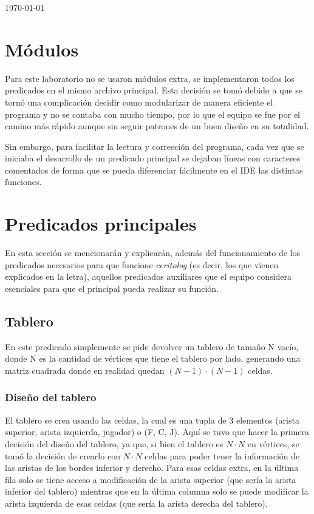 \documentclass[12pt]{article} %
\begin{document}
\begin{titlepage}
		{\large \today}\\[1cm] %
		
		\vfill %
		
	\end{titlepage}
	
	\section{Módulos}
	Para este laboratorio no se usaron módulos extra, se implementaron todos los predicados en el mismo archivo principal. Esta decisión se tomó debido a que se tornó una complicación decidir como modularizar de manera eficiente el programa y no se contaba con mucho tiempo, por lo que el equipo se fue por el camino más rápido aunque sin seguir patrones de un buen diseño en su totalidad.
	
	Sin embargo, para facilitar la lectura y corrección del programa, cada vez que se iniciaba el desarrollo de un predicado principal se dejaban líneas con caracteres comentados de forma que se pueda diferenciar fácilmente en el IDE las distintas funciones.
	
	\section{Predicados principales}
	En esta sección se mencionarán y explicarán, además del funcionamiento de los predicados necesarios para que funcione \textit{ceritolog} (es decir, los que vienen explicados en la letra), aquellos predicados auxiliares que el equipo considera esenciales para que el principal pueda realizar su función.
	
		\subsection{Tablero}
		En este predicado simplemente se pide devolver un tablero de tamaño N vacío, donde N es la cantidad de vértices que tiene el tablero por lado, generando una matriz cuadrada donde en realidad quedan $(N-1)\cdot(N-1)$ celdas. \\
		
			\subsubsection{Diseño del tablero}
			El tablero se crea usando las celdas, la cual es una tupla de 3 elementos (arista superior, arista izquierda, jugador) o (F, C, J). Aquí se tuvo que hacer la primera decisión del diseño del tablero, ya que, si bien el tablero es $N\cdot N$ en vértices, se tomó la decisión de crearlo con $N\cdot N$ celdas para poder tener la información de las aristas de los bordes inferior y derecho. Para esas celdas extra, en la última fila solo se tiene acceso a modificación de la arista superior (que sería la arista inferior del tablero) mientras que en la última columna solo se puede modificar la arista izquierda de esas celdas (que sería la arista derecha del tablero).
			
\end{document}
